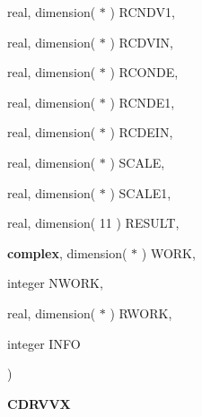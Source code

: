 {\begin{DoxyParamCaption}
\item[{real, dimension( $\ast$ )}]{R\+C\+N\+D\+V1, }
\item[{real, dimension( $\ast$ )}]{R\+C\+D\+V\+I\+N, }
\item[{real, dimension( $\ast$ )}]{R\+C\+O\+N\+D\+E, }
\item[{real, dimension( $\ast$ )}]{R\+C\+N\+D\+E1, }
\item[{real, dimension( $\ast$ )}]{R\+C\+D\+E\+I\+N, }
\item[{real, dimension( $\ast$ )}]{S\+C\+A\+L\+E, }
\item[{real, dimension( $\ast$ )}]{S\+C\+A\+L\+E1, }
\item[{real, dimension( 11 )}]{R\+E\+S\+U\+L\+T, }
\item[{{\bf complex}, dimension( $\ast$ )}]{W\+O\+R\+K, }
\item[{integer}]{N\+W\+O\+R\+K, }
\item[{real, dimension( $\ast$ )}]{R\+W\+O\+R\+K, }
\item[{integer}]{I\+N\+F\+O}
\end{DoxyParamCaption}
)}\label{group__complex__eig_ga2de5d5cdd79b4ab56fd984ac860f1b36}


{\bfseries C\+D\+R\+V\+V\+X} 

